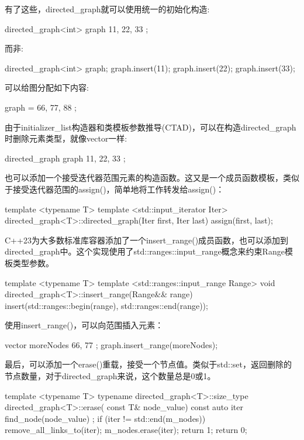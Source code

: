 有了这些，directed\_graph就可以使用统一的初始化构造:

\begin{cpp}
directed_graph<int> graph { 11, 22, 33 };
\end{cpp}

而非:

\begin{cpp}
directed_graph<int> graph;
graph.insert(11);
graph.insert(22);
graph.insert(33);
\end{cpp}

可以给图分配如下内容:

\begin{cpp}
graph = { 66, 77, 88 };
\end{cpp}

由于initializer\_list构造器和类模板参数推导(CTAD)，可以在构造directed\_graph时删除元素类型，就像vector一样:

\begin{cpp}
directed_graph graph { 11, 22, 33 };
\end{cpp}

也可以添加一个接受迭代器范围元素的构造函数。这又是一个成员函数模板，类似于接受迭代器范围的assign()，简单地将工作转发给assign()：

\begin{cpp}
template <typename T>
template <std::input_iterator Iter>
directed_graph<T>::directed_graph(Iter first, Iter last)
{
    assign(first, last);
}
\end{cpp}

C++23为大多数标准库容器添加了一个insert\_range()成员函数，也可以添加到directed\_graph中。这个实现使用了std::ranges::input\_range概念来约束Range模板类型参数。

\begin{cpp}
template <typename T>
template <std::ranges::input_range Range>
void directed_graph<T>::insert_range(Range&& range)
{
    insert(std::ranges::begin(range), std::ranges::end(range));
}
\end{cpp}

使用insert\_range()，可以向范围插入元素：

\begin{cpp}
vector moreNodes { 66, 77 };
graph.insert_range(moreNodes);
\end{cpp}

最后，可以添加一个erase()重载，接受一个节点值。类似于std::set，返回删除的节点数量，对于directed\_graph来说，这个数量总是0或1。

\begin{cpp}
template <typename T>
typename directed_graph<T>::size_type directed_graph<T>::erase(
    const T& node_value)
{
    const auto iter { find_node(node_value) };
    if (iter != std::end(m_nodes)) {
        remove_all_links_to(iter);
        m_nodes.erase(iter);
        return 1;
    }
    return 0;
}
\end{cpp}

